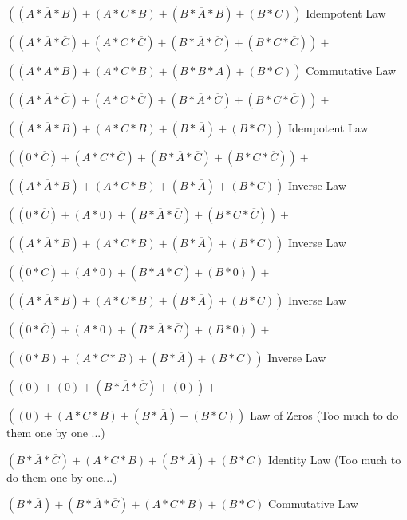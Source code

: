 \documentclass{article}
\begin{document}
    $((A*\overline{A}*B) + (A*C*B)+ (B*\overline{A}*B) + (B*C))$ \hspace*{0.1in} Idempotent Law

    $((A*\overline{A}*\overline{C}) + (A*C*\overline{C})+ (B*\overline{A}*\overline{C}) + (B*C*\overline{C})) + $
    
    $((A*\overline{A}*B) + (A*C*B)+ (B*B*\overline{A}) + (B*C))$ \hspace*{0.1in} Commutative Law

    $((A*\overline{A}*\overline{C}) + (A*C*\overline{C})+ (B*\overline{A}*\overline{C}) + (B*C*\overline{C})) + $
    
    $((A*\overline{A}*B) + (A*C*B)+ (B*\overline{A}) + (B*C))$ \hspace*{0.1in} Idempotent Law

    $((0*\overline{C}) + (A*C*\overline{C})+ (B*\overline{A}*\overline{C}) + (B*C*\overline{C})) + $
    
    $((A*\overline{A}*B) + (A*C*B)+ (B*\overline{A}) + (B*C))$ \hspace*{0.1in} Inverse Law

    $((0*\overline{C}) + (A*0)+ (B*\overline{A}*\overline{C}) + (B*C*\overline{C})) + $
    
    $((A*\overline{A}*B) + (A*C*B)+ (B*\overline{A}) + (B*C))$ \hspace*{0.1in} Inverse Law

    $((0*\overline{C}) + (A*0)+ (B*\overline{A}*\overline{C}) + (B*0)) + $
    
    $((A*\overline{A}*B) + (A*C*B)+ (B*\overline{A}) + (B*C))$ \hspace*{0.1in} Inverse Law

    $((0*\overline{C}) + (A*0)+ (B*\overline{A}*\overline{C}) + (B*0)) + $
    
    $((0*B) + (A*C*B)+ (B*\overline{A}) + (B*C))$ \hspace*{0.1in} Inverse Law

    $((0) + (0)+ (B*\overline{A}*\overline{C}) + (0)) + $
    
    $((0) + (A*C*B)+ (B*\overline{A}) + (B*C))$ \hspace*{0.1in} Law of Zeros (Too much to do them one by one ...)

    $(B*\overline{A}*\overline{C}) + (A*C*B)+ (B*\overline{A}) + (B*C)$ \hspace*{0.1in} Identity Law (Too much to do them one by one...)

    $(B*\overline{A})+ (B*\overline{A}*\overline{C}) + (A*C*B) + (B*C)$ \hspace*{0.1in} Commutative Law
\end{document}

